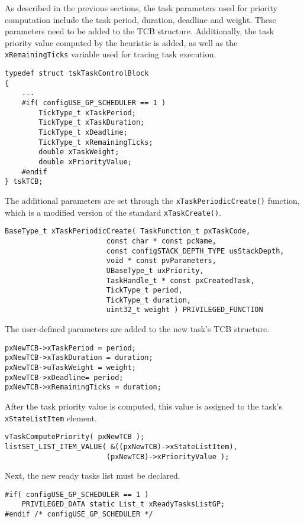 As described in the previous sections, the task parameters used for priority computation include the task period, duration, deadline and weight. 
These parameters need to be added to the TCB structure. 
Additionally, the task priority value computed by the heuristic is added, as well as the \verb$xRemainingTicks$ variable used for tracing task execution.
\begin{lstlisting}[frame=none, label={TCB}, caption={Modification of the TCB.}, captionpos=b]
typedef struct tskTaskControlBlock
{
	...
	#if( configUSE_GP_SCHEDULER == 1 )
		TickType_t xTaskPeriod;
		TickType_t xTaskDuration;
		TickType_t xDeadline;
		TickType_t xRemainingTicks;
		double xTaskWeight;
		double xPriorityValue;
	#endif
} tskTCB;
\end{lstlisting}
The additional parameters are set through the \verb$xTaskPeriodicCreate()$ function, which is a modified version of the standard \verb$xTaskCreate()$.
\begin{lstlisting}[frame=none, label={periodicCreate}, caption={The \texttt{xTaskPeriodicCreate()} function prototype.}, captionpos=b]
BaseType_t xTaskPeriodicCreate(	TaskFunction_t pxTaskCode,
						const char * const pcName,		
						const configSTACK_DEPTH_TYPE usStackDepth,
						void * const pvParameters,
						UBaseType_t uxPriority,
						TaskHandle_t * const pxCreatedTask,
						TickType_t period,
						TickType_t duration,
						uint32_t weight ) PRIVILEGED_FUNCTION
\end{lstlisting}
The user-defined parameters are added to the new task's TCB structure. 
\begin{lstlisting}[frame=none, label={TCB_params}, caption={Adding the user-defined task parameters to the TCB structure.}, captionpos=b]
pxNewTCB->xTaskPeriod = period;
pxNewTCB->xTaskDuration = duration;
pxNewTCB->uTaskWeight = weight;
pxNewTCB->xDeadline= period;
pxNewTCB->xRemainingTicks = duration;
\end{lstlisting}
After the task priority value is computed, this value is assigned to the task's \\\verb$xStateListItem$ element. 
\begin{lstlisting}[frame=none, label={init_priority}, caption={Assigning the task priority to the \texttt{xStateListItem} element.}, captionpos=b]
vTaskComputePriority( pxNewTCB );
listSET_LIST_ITEM_VALUE( &((pxNewTCB)->xStateListItem), 
						(pxNewTCB)->xPriorityValue );
\end{lstlisting}
Next, the new ready tasks list must be declared.
\begin{lstlisting}[frame=none, label={ready_list}, caption={Declaration of the new ready tasks list.}, captionpos=b]
#if( configUSE_GP_SCHEDULER == 1 )
	PRIVILEGED_DATA static List_t xReadyTasksListGP;
#endif /* configUSE_GP_SCHEDULER */
\end{lstlisting}
